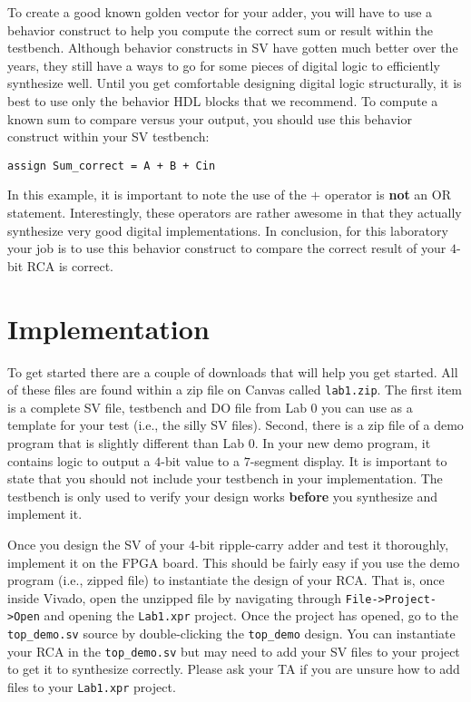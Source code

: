\documentclass{article}
\begin{document}
To create a good known golden vector for your adder, you will have to
use a behavior construct to help you compute the correct sum or
result within the testbench.  Although
behavior constructs in SV have gotten much better over the
years, they still have a ways to go for some pieces of digital logic
to efficiently synthesize well.
Until you get comfortable designing digital logic structurally, it is
best to use only the behavior HDL blocks that we recommend.  To compute a
known sum to compare versus your output, you should
use this behavior construct within your SV testbench:
\begin{verbatim}
assign Sum_correct = A + B + Cin
\end{verbatim}
In this example, it is important to note the use of the $+$ operator
is \textbf{not} an OR statement.  Interestingly, these operators
are rather awesome in that they actually synthesize very good
digital implementations.  In conclusion, for this laboratory your job is to use this
behavior construct to compare the correct result of your $4$-bit RCA is
correct.

\section{Implementation}

To get started there are a couple of downloads that will help you
get started.  All of these files are found within a zip file on Canvas
called \verb!lab1.zip!.
The first item is a complete SV file, testbench and DO
file from Lab 0 you can use as a template for your test (i.e., the
silly SV files).   
Second, there is a zip
file of a demo program that is slightly different than Lab 0.  In your
new demo program, it contains logic to output a $4$-bit value to a
$7$-segment display.  
It is important to state that you should not include your testbench in
your implementation. The testbench is only used to verify your design
works \textbf{before} you synthesize and implement it.

Once you design the SV of your $4$-bit ripple-carry adder
and test it thoroughly, implement it on the
FPGA board.  This should be fairly easy if you use the demo program
(i.e., zipped file) to instantiate the design of your RCA.
That is, once inside Vivado, open the unzipped file by navigating
through \verb!File->Project->Open! and opening the \verb!Lab1.xpr!
project.  Once the project has opened, go to the \verb!top_demo.sv!
source by double-clicking the \verb!top_demo!
design.  You can instantiate your RCA in the \verb!top_demo.sv! but
may need to add your SV files to your project to get it to synthesize
correctly.
Please ask your TA if you are unsure
how to add files to your \verb!Lab1.xpr! project.
\end{document}
